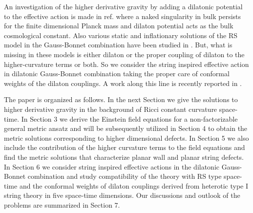 \documentclass[a4paper,12pt]{article}
\begin{document}
An investigation of the higher derivative gravity by adding a dilatonic 
potential to the effective action is made in ref.\cite{ILZ} where a naked 
singularity in \coordHE{} bulk persists for the finite \coordHE{} dimensional Planck 
mass and dilaton potential acts as the bulk cosmological constant. Also 
various static and inflationary solutions of the RS model in the Gauss-Bonnet 
combination have been studied in \cite{KKL}. But, what is missing in these 
models is either dilaton or the proper coupling of dilaton to the 
higher-curvature terms or both. So we consider the string inspired effective 
action \cite{AAT,ESF} in dilatonic Gauss-Bonnet combination taking the 
proper care of conformal weights of the dilaton couplings. A work along 
this line is recently reported in \cite{NIC}. 

The paper is organized as follows. In the next Section we give the 
solutions to higher derivative gravity in the background of Ricci constant 
curvature space-time. In Section 3 we derive the Einstein field equations 
for a non-factorizable general metric ansatz and will be subsequently 
utilized in Section 4 to obtain the metric solutions corresponding to higher 
dimensional defects. In Section 5 we also include the contribution of the 
higher curvature terms to the field equations and find the metric solutions 
that characterize planar wall and planar string defects. 
In Section 6 we consider string inspired effective actions in the dilatonic 
Gauss-Bonnet combination and study compatibility of the theory with 
RS type space-time and the conformal weights of dilaton couplings derived  
from heterotic type I string theory in five space-time dimensions. 
Our discussions and outlook of the problems are summarized in Section 7.
\end{document}
